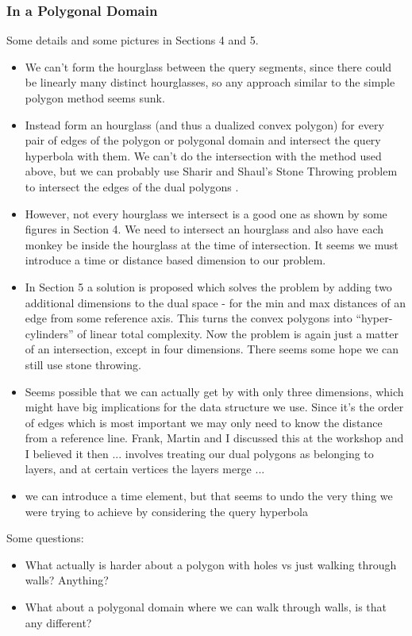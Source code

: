 \documentclass{article}
\begin{document}
\subsubsection{In a Polygonal Domain}
Some details and some pictures in Sections 4 and 5.
\begin{itemize}
    \item We can't form the hourglass between the query segments, since there could be linearly many distinct hourglasses, so any approach similar to the simple polygon method seems sunk.
    \item Instead form an hourglass (and thus a dualized convex polygon) for every pair of edges of the polygon or polygonal domain and intersect the query hyperbola with them. We can't do the intersection with the method used above, but we can probably use Sharir and Shaul's Stone Throwing problem to intersect the edges of the dual polygons \cite{SHARIR2005239}.
    \item However, not every hourglass we intersect is a good one as shown by some figures in Section 4. We need to intersect an hourglass and also have each monkey be inside the hourglass at the time of intersection. It seems we must introduce a time or distance based dimension to our problem.
    \item In Section 5 a solution is proposed which solves the problem by adding two additional dimensions to the dual space - for the min and max distances of an edge from some reference axis. This turns the convex polygons into ``hyper-cylinders'' of linear total complexity. Now the problem is again just a matter of an intersection, except in four dimensions. There seems some hope we can still use stone throwing.
    \item Seems possible that we can actually get by with only three dimensions, which might have big implications for the data structure we use. Since it's the order of edges which is most important we may only need to know the distance from a reference line. Frank, Martin and I discussed this at the workshop and I believed it then ... involves treating our dual polygons as belonging to layers, and at certain vertices the layers merge ...
    \item we can introduce a time element, but that seems to undo the very thing we were trying to achieve by considering the query hyperbola
\end{itemize}

Some questions:
\begin{itemize}
  \item What actually is harder about a polygon with holes vs just walking through walls? Anything?
  \item What about a polygonal domain where we can walk through walls, is that any different?
\end{itemize}
\end{document}
